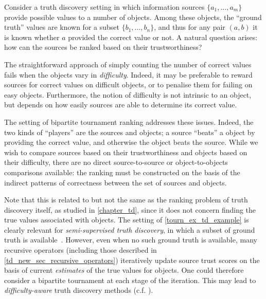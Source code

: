 \begin{example}
    \label{tourn_ex_td_example}
    Consider a truth discovery setting in which information sources $\{a_1,
    \ldots, a_m\}$ provide possible values to a number of objects. Among
    these objects, the ``ground truth'' values are known for a subset $\{b_1,
    \ldots, b_n\}$, and thus for any pair $(a, b)$ it is known whether $a$
    provided the correct value or not. A natural question arises: how can the
    sources be ranked based on their trustworthiness?

    The straightforward approach of simply counting the number of correct
    values fails when the objects vary in \emph{difficulty}. Indeed, it may be
    preferable to reward sources for correct values on difficult objects, or
    to penalise them for failing on easy objects. Furthermore, the notion of
    difficulty is not intrinsic to an object, but depends on how easily
    sources are able to determine its correct value.\footnotemark{}

    The setting of bipartite tournament ranking addresses these issues.
    Indeed, the two kinds of ``players'' are the sources and objects; a source
    ``beats'' a object by providing the correct value, and otherwise the object
    beats the source. While we wish to compare sources based on their
    trustworthiness and objects based on their difficulty, there are no direct
    source-to-source or object-to-objects comparisons available: the ranking
    must be constructed on the basis of the indirect patterns of correctness
    between the set of sources and objects.
\end{example}


Note that this is related to but not the same as the ranking problem of truth
discovery itself, as studied in \cref{chapter_td}, since it does not concern
finding the true values associated with objects. The setting of
\cref{tourn_ex_td_example} is clearly relevant for \emph{semi-supervised truth
discovery}, in which a subset of ground truth is
available~\cite{yin_supervised_2011,rekatsinas2017slimfast}. However, even when
no such ground truth is available, many recursive operators (including those
described in \cref{td_new_sec_recursive_operators}) iteratively update source
trust scores on the basis of current \emph{estimates} of the true values for
objects. One could therefore consider a bipartite tournament at each stage of
the iteration. This may lead to \emph{difficulty-aware} truth discovery methods
(c.f. \textcite{galland2010}).

